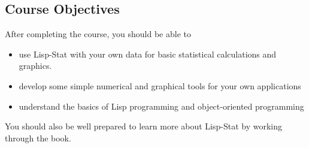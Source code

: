 \begin{slide}{}
\section{Course Objectives}
After completing the course, you should be able to
\begin{itemize}
\item
use Lisp-Stat with your own data for basic statistical calculations
and graphics.
\item
develop some simple numerical and graphical tools for your own
applications
\item
understand the basics of Lisp programming and object-oriented
programming
\end{itemize}
You should also be well prepared to learn more about Lisp-Stat by working
through the book.
\end{slide}




